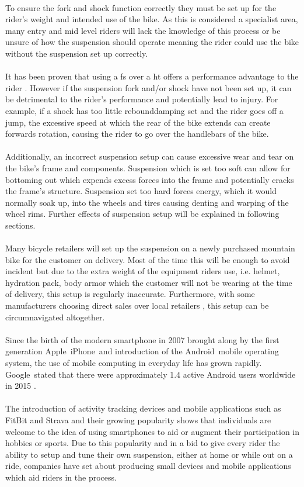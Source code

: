 	\\
	To ensure the \gls{fork} and \gls{shock} function correctly they must be set up for the rider's weight and intended use of the bike. As this is considered a specialist area, many entry and mid level riders will lack the knowledge of this process or be unsure of how the suspension should operate meaning the rider could use the bike without the suspension set up correctly.
	\\\\
	It has been proven that using a \gls{fs} over a \gls{ht} offers a performance advantage to the rider \citep{fullsusperf}. However if the suspension fork and/or shock have not been set up, it can be detrimental to the rider's performance and potentially lead to injury. For example, if a shock has too little \gls{rebounddamping} set and the rider goes off a jump, the excessive speed at which the rear of the bike extends can create forwards rotation, causing the rider to go over the handlebars of the bike.
	\\\\
	Additionally, an incorrect suspension setup can cause excessive wear and tear on the bike's frame and components. Suspension which is set too soft can allow for bottoming out which expends excess forces into the frame and potentially cracks the frame's structure. Suspension set too hard forces energy, which it would normally soak up, into the wheels and tires causing denting and warping of the wheel rims. Further effects of suspension setup will be explained in following sections.
	\\\\
	Many bicycle retailers will set up the suspension on a newly purchased mountain bike for the customer on delivery. Most of the time this will be enough to avoid incident but due to the extra weight of the equipment riders use, i.e. helmet, hydration pack, body armor which the customer will not be wearing at the time of delivery, this setup is regularly inaccurate. Furthermore, with some manufacturers choosing direct sales over local retailers \citep{roseonline, ytonline}, this setup can be circumnavigated altogether.
	\\\\
	Since the birth of the modern smartphone in 2007 brought along by the first generation Apple\textregistered\ iPhone\textregistered\ and introduction of the Android\texttrademark\ mobile operating system, the use of mobile computing in everyday life has grown rapidly. Google\texttrademark\ stated that there were approximately 1.4 active Android users worldwide in 2015 \citep{androidusers}.
	\\\\
	The introduction of activity tracking devices and mobile applications such as FitBit \citep{fitbit} and Strava \citep{strava} and their growing popularity \citep{apppopularity} shows that individuals are welcome to the idea of using smartphones to aid or augment their participation in hobbies or sports. Due to this popularity and in a bid to give every rider the ability to setup and tune their own suspension, either at home or while out on a ride, companies have set about producing small devices \citep{sussmybike, shockwiztrademark} and mobile applications \citep{foxird} which aid riders in the process.
